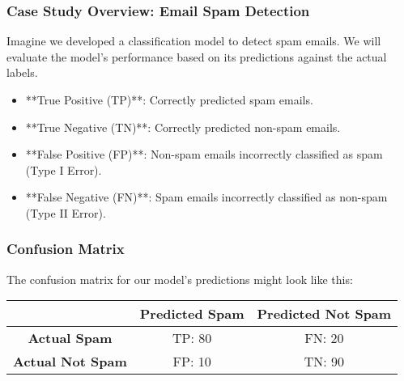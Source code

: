 \documentclass[aspectratio=169]{beamer}
\begin{document}
\begin{frame}[fragile]
    \frametitle{Case Study Overview: Email Spam Detection}
    Imagine we developed a classification model to detect spam emails. We will evaluate the model's performance based on its predictions against the actual labels.
    
    \begin{itemize}
        \item **True Positive (TP)**: Correctly predicted spam emails.
        \item **True Negative (TN)**: Correctly predicted non-spam emails.
        \item **False Positive (FP)**: Non-spam emails incorrectly classified as spam (Type I Error).
        \item **False Negative (FN)**: Spam emails incorrectly classified as non-spam (Type II Error).
    \end{itemize}
\end{frame}

\begin{frame}[fragile]
    \frametitle{Confusion Matrix}
    The confusion matrix for our model's predictions might look like this:

    \begin{center}
    \begin{tabular}{|c|c|c|}
        \hline
        & \textbf{Predicted Spam} & \textbf{Predicted Not Spam} \\
        \hline
        \textbf{Actual Spam} & TP: 80 & FN: 20 \\
        \hline
        \textbf{Actual Not Spam} & FP: 10 & TN: 90 \\
        \hline
    \end{tabular}
    \end{center}
\end{frame}
\end{document}
